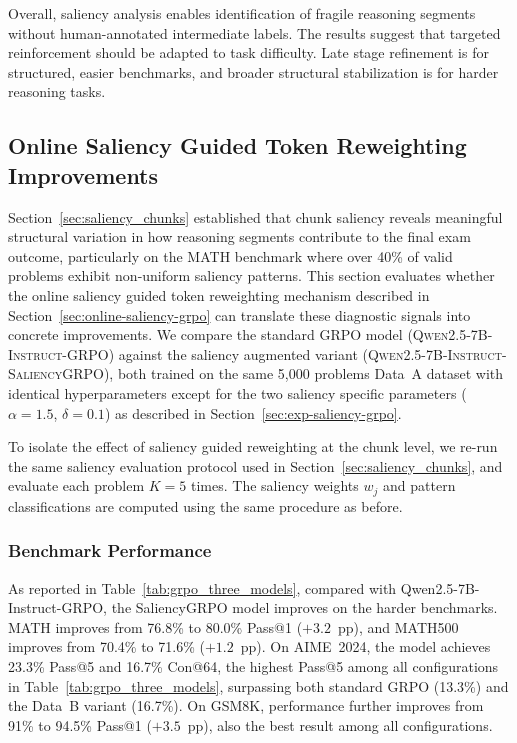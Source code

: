 \documentclass[12pt]{report}
\begin{document}
Overall, saliency analysis enables identification of fragile
reasoning segments without human-annotated intermediate labels. The
results suggest that targeted reinforcement should be adapted to task
difficulty. Late stage refinement is for structured, easier benchmarks,
and broader structural stabilization is for harder reasoning tasks.

\subsection{Online Saliency Guided Token Reweighting Improvements}
\label{sec:saliency-grpo-results}

Section~\ref{sec:saliency_chunks} established that chunk saliency reveals meaningful structural
variation in how reasoning segments contribute to the final exam outcome, particularly on the MATH
benchmark where over 40\% of valid problems exhibit non-uniform saliency patterns.  This section evaluates
whether the online saliency guided token reweighting mechanism described in Section~\ref{sec:online-saliency-grpo} can translate
these diagnostic signals into concrete improvements.  We compare the standard GRPO model
(\textsc{Qwen2.5-7B-Instruct-GRPO}) against the saliency augmented variant
(\textsc{Qwen2.5-7B-Instruct-SaliencyGRPO}), both trained on the same 5{,}000 problems
Data~A dataset with identical hyperparameters except for the two saliency specific parameters
($\alpha=1.5$, $\delta=0.1$) as described in Section~\ref{sec:exp-saliency-grpo}.

To isolate the effect of saliency guided reweighting at the chunk level, we re-run the same saliency evaluation protocol used in Section~\ref{sec:saliency_chunks}, and evaluate each problem $K=5$ times. The saliency weights ${w_j}$ and pattern classifications are computed using the same procedure as before.

\subsubsection{Benchmark Performance}

As reported in Table~\ref{tab:grpo_three_models}, compared with
Qwen2.5-7B-Instruct-GRPO, the SaliencyGRPO model improves on the harder benchmarks. MATH improves from 76.8\% to 80.0\% Pass@1 ($+3.2$~pp), and MATH500 improves from 70.4\% to 71.6\% ($+1.2$~pp). 
On AIME~2024, the model achieves 23.3\% Pass@5 and 16.7\% Con@64, the highest Pass@5 among all configurations in Table~\ref{tab:grpo_three_models}, surpassing both standard GRPO (13.3\%) and the Data~B variant (16.7\%). 
On GSM8K, performance further improves from 91\% to 94.5\% Pass@1 ($+3.5$~pp), also the best result among all configurations.
\end{document}

